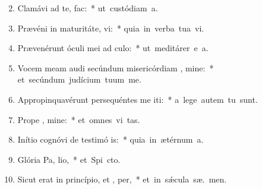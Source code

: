 \begin{flushleft}
\begin{enumerate}[leftmargin=*]
\setcounter{enumi}{1}


\item Clamávi ad te,   fac:~* \mbox{ut custódiam  a.}
\item Prævéni in maturitáte,  vi:~* \mbox{quia in verba tua vi.}
\item Prævenérunt óculi mei ad  culo:~* \mbox{ut meditárer e a.}
\item Vocem meam audi secúndum misericórdiam , mine:~* \mbox{et secúndum judícium tuum  me.}
\item Appropinquavérunt persequéntes me iti:~* \mbox{a lege autem tu   sunt.}
\item Prope  , mine:~* \mbox{et omnes vi  tas.}
\item Inítio cognóvi de testimó is:~* \mbox{quia in ætérnum  a.}
\item Glória Pa,  lio,~* \mbox{et Spi cto.}
\item Sicut erat in princípio, et ,  per,~* \mbox{et in s\'{\ae}cula sæ. men.}




\end{enumerate}
\end{flushleft}

